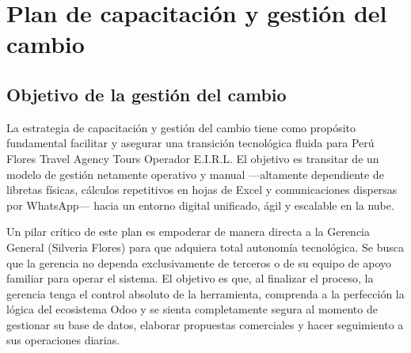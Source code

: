\section{Plan de capacitación y gestión del cambio}

\subsection{Objetivo de la gestión del cambio}
\begin{indentedsubsection}
La estrategia de capacitación y gestión del cambio tiene como propósito fundamental facilitar y asegurar una transición tecnológica fluida para Perú Flores Travel Agency Tours Operador E.I.R.L. El objetivo es transitar de un modelo de gestión netamente operativo y manual ---altamente dependiente de libretas físicas, cálculos repetitivos en hojas de Excel y comunicaciones dispersas por WhatsApp--- hacia un entorno digital unificado, ágil y escalable en la nube.

Un pilar crítico de este plan es empoderar de manera directa a la Gerencia General (Silveria Flores) para que adquiera total autonomía tecnológica. Se busca que la gerencia no dependa exclusivamente de terceros o de su equipo de apoyo familiar para operar el sistema. El objetivo es que, al finalizar el proceso, la gerencia tenga el control absoluto de la herramienta, comprenda a la perfección la lógica del ecosistema Odoo y se sienta completamente segura al momento de gestionar su base de datos, elaborar propuestas comerciales y hacer seguimiento a sus operaciones diarias.
\end{indentedsubsection}

